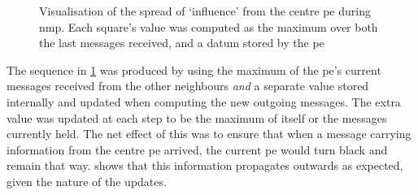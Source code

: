 \begin{figure}
    \caption[Visualisation of the spread of `influence' from the centre  during ]{Visualisation of the spread of `influence' from the centre \gls{pe} during \gls{nmp}.  Each square's value was computed as the maximum over both the last messages received, and a datum stored by the \gls{pe}}
    \label{fig:nmp:maxpdatum}
\end{figure}

The sequence in \cref{fig:nmp:maxpdatum} was produced by using the maximum of the \gls{pe}'s current messages received from the other neighbours \emph{and} a separate value stored internally and updated when computing the new outgoing messages.  The extra value was updated at each step to be the maximum of itself or the messages currently held.  The net effect of this was to ensure that when a message carrying information from the centre \gls{pe} arrived, the current \gls{pe} would turn black and remain that way.   shows that this information propagates outwards as expected, given the nature of the updates.

